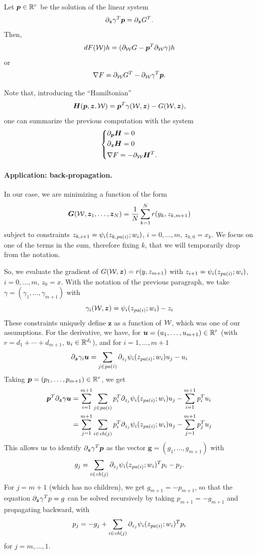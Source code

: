 Let $\bm p\in {\mathbb{R}}^r$ be the solution of the linear system
\[
\partial_{\bm z}\gamma^T \bm p =  \partial_{\bm z} G^T.
\]
Then,
\[
dF({\mathcal W}) h = (\partial_{\mathcal W} G - \bm p^T \partial_{{\mathcal W}} \gamma) h
\]
or 
\[
\nabla F = \partial_{\mathcal W} G^T - \partial_{{\mathcal W}} \gamma^T \bm p.
\]

Note that, introducing the ``Hamiltonian''
\[
\bm H(\bm p, \bm z, {\mathcal W}) = \bm p^T \gamma({\mathcal W}, \bm z) - G({\mathcal W}, \bm z), 
\]
one can summarize the previous computation with the system
\[
\left\{
\begin{aligned}
&\partial_{\bm p} \bm H = 0\\
&\partial_{\bm z}\bm H = 0 \\
&\nabla F = - \partial_{{\mathcal W}} \bm H^T.
\end{aligned}
\right.
\]
\bigskip

\paragraph{Application: back-propagation.}
In our case, we are minimizing a function of the form
\[
\bm G({\mathcal W}, \bm z_1, \ldots, \bm z_N) = \frac1N \sum_{k=1}^N r(y_k, z_{k, m+1})
\]
subject to constraints $z_{k,i+1} = \psi_i(z_{k, {\mathit{pa}(i)}}; w_i)$, $i=0, \ldots, m$, $z_{k,0} = x_k$. We focus on one of the terms in the sum, therefore fixing $k$, that we will temporarily drop from the notation.

So, we evaluate the gradient of $G({\mathcal W}, \bm z) = r(y, z_{m+1})$ with $z_{i+1} = \psi_i(z_{{\mathit{pa}(i)}}; w_i)$, $i=0, \ldots, m$, $z_0 = x$. With the notation of the previous paragraph, we take $\gamma = (\gamma_1, \ldots, \gamma_{m+1})$ with
\[
\gamma_i({\mathcal W}, \bm z) = \psi_{i}(z_{{\mathit{pa}(i)}}; w_i) - z_i
\]
These constraints uniquely define $\boldsymbol z$ as a function of ${\mathcal W}$, which was one of our assumptions. For the derivative, we have, for $\bm u= (u_1, \ldots, u_{m+1})\in {\mathbb{R}}^r$ (with $r = d_1 + \cdots+d_{m+1}$, $u_i\in {\mathbb{R}}^{d_i}$), and for $i=1, \ldots, m+1$  
\[
\partial_{\bm z}\gamma_i \bm u = \sum_{j \in {\mathit{pa}(i)}} \partial_{z_j} \psi_i(z_{{\mathit{pa}(i)}}; w_i) u_j - u_i
\]
Taking $\bm p = (p_1, \ldots, p_{m+1}) \in {\mathbb{R}}^r$, we get
\begin{align*}
\bm p^T \partial_{\bm z}\gamma \bm u &= 
\sum_{i=1}^{m+1}\sum_{j \in {\mathit{pa}(i)}} p_i^T\partial_{z_j} \psi_i(z_{{\mathit{pa}(i)}}; w_i) u_j - \sum_{i=1}^{m+1} p_i^T u_{i} \\
&= 
\sum_{j=1}^{m+1}\sum_{i \in {\mathit{ch}(j)}} p_i^T\partial_{z_j} \psi_i(z_{{\mathit{pa}(i)}}; w_i) u_j - \sum_{j=1}^{m+1} p_j^T u_{j} 
\end{align*}
This allows us to identify $\partial_{\bm z}\gamma^T \bm p$ as the vector $\boldsymbol g = (g_1, \ldots, g_{m+1})$ with 
\[
g_{j} = \sum_{i \in {\mathit{ch}(j)}} \partial_{z_j} \psi_i(z_{{\mathit{pa}(i)}}; w_i)^T p_i - p_j.
\]
For $j=m+1$ (which has no children), we get $g_{m+1} = -p_{m+1}$, so that the equation $\partial_{\bm z} \gamma^T p = g$ can be solved recursively by taking $p_{m+1} = -g_{m+1}$ and propagating backward, with
\[
p_{j} = -g_j + \sum_{i \in {\mathit{ch}(j)}} \partial_{z_j} \psi_i(z_{{\mathit{pa}(i)}}; w_i)^T p_i
\]
for $j=m, \ldots, 1$. 

